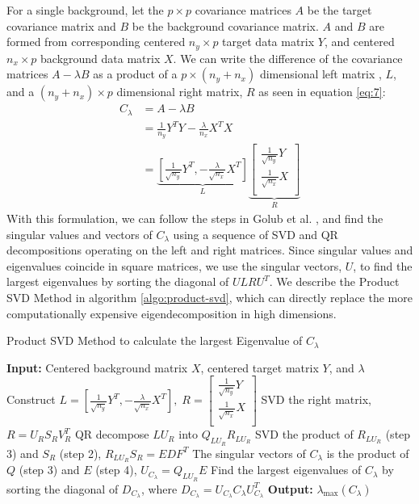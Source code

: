 \documentclass[12pt]{article}
\begin{document}
For a single background, let the $p \times p$ covariance matrices $A$ be the target covariance matrix and $B$ be the background covariance matrix. $A$ and $B$ are formed from corresponding centered $n_y \times p$ target data matrix $Y$,   and centered $n_x \times p$ background data matrix $X$.  We can write the difference of the covariance matrices $A - \lambda B$ as a product of a $p \times (n_y + n_x)$ dimensional left matrix , $L$, and a $(n_y + n_x) \times p$ dimensional right matrix, $R$ as seen in equation \ref{eq:7}:
\begin{align}
  C_\lambda &= A - \lambda B \nonumber\\
            &=\frac{1}{n_y}Y^TY -\frac{\lambda}{n_x} X^T X\nonumber \\
            &=  \underbrace{\left[ \frac{1}{\sqrt{n_{y}}}Y^T, - \frac{\lambda}{\sqrt{n_{x}}} X^T\right]}_{L}\underbrace{\begin{bmatrix*} \frac{1}{\sqrt{n_{y}}}Y \\ \frac{1}{\sqrt{n_{x}}}X \\ \end{bmatrix*}}_{R} \label{eq:7}
\end{align}
With this formulation, we can follow the steps in Golub et al.  \cite{Golub}, and find the singular values and vectors of $C_\lambda$ using a sequence of SVD and QR decompositions operating on the left and right matrices. Since singular values and eigenvalues coincide in square matrices, we use the singular vectors, $U$, to find the largest eigenvalues by sorting the diagonal of $ULRU^T$.  
We describe the Product SVD Method in algorithm \ref{algo:product-svd}, which can directly replace the more computationally expensive eigendecomposition in high dimensions.

\begin{algorithm}[ht]
  \label{algo:product-svd}
  \caption{Product SVD Method to calculate the largest Eigenvalue of $C_\lambda$}
  \SetAlgoLined
  \textbf{Input:} Centered background matrix $X$, centered target matrix $Y$, and $\lambda$\;
  \nl Construct 
  $  L = \left[ \frac{1}{\sqrt{n_{y}}}Y^T, - \frac{\lambda}{\sqrt{n_{x}}} X^T\right],\;
  R = \begin{bmatrix*} \frac{1}{\sqrt{n_{y}}}Y \\ \frac{1}{\sqrt{n_{x}}}X \\ \end{bmatrix*} $\;
  \nl  SVD the right matrix, $R = U_R S_R V^T_R$ \;
  \nl  QR decompose $LU_R$ into  $Q_{LU_R}R_{LU_R}$ \;
  \nl  SVD the product of $R_{LU_R}$ (step 3) and $S_R$ (step 2), $R_{LU_R}S_{R} = EDF^T$ \;
  \nl  The singular vectors of $C_\lambda$ is the product of $Q$ (step 3) and $E$ (step 4), $U_{C_\lambda} = Q_{LU_R}E$ \;
  \nl  Find the largest eigenvalues of $C_\lambda$ by sorting the diagonal of $D_{C_\lambda}$, where $D_{C_\lambda} = U_{C_\lambda} C_\lambda U_{C_\lambda}^T$ \;
  \textbf{Output:} $\lambda_{\text{max}}\left( C_\lambda \right)$ 
\end{algorithm}
\end{document}
